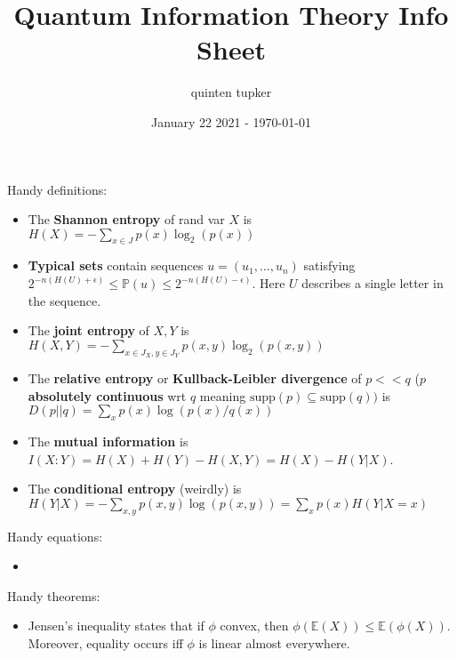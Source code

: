 \documentclass{article}
\title{Quantum Information Theory Info Sheet}
\author{quinten tupker}
\date{January 22 2021 - \today}
\theoremstyle{definition}
\begin{document}
\maketitle

Handy definitions:

\begin{itemize}
\item The \textbf{Shannon entropy} of rand var $X$ is $H(X) = -\sum_{x \in J} 
p(x) \log_2 (p(x))$
\item \textbf{Typical sets} contain sequences $u = (u_1, \dots, u_n)$ satisfying
$ 2^{-n(H(U) + \epsilon)} \leq \mathbb{P}(u) \leq 2^{-n(H(U) - \epsilon)}$. Here
$U$ describes a single letter in the sequence.
\item The \textbf{joint entropy} of $X, Y$ is $H(X, Y) = -\sum_{x \in J_X, y \in
  J_Y} p(x, y) \log_2(p(x, y))$
\item The \textbf{relative entropy} or \textbf{Kullback-Leibler divergence} of 
  $p << q$ ($p$ \textbf{absolutely continuous} wrt $q$ meaning $\text{supp}(p) 
    \subseteq \text{supp}(q))$ is $D(p||q) = \sum_x p(x) \log(p(x) / q(x))$
\item The \textbf{mutual information} is $I(X:Y) = H(X) + H(Y) - H(X, Y) =
  H(X) - H(Y | X)$.
\item The \textbf{conditional entropy} (weirdly) is $H(Y | X) = - \sum_{x, y}
  p(x, y) \log(p(x, y)) = \sum_x p(x) H(Y | X=x)$
\end{itemize}

Handy equations:

\begin{itemize}
\item
\end{itemize}

Handy theorems:

\begin{itemize}
\item Jensen's inequality states that if $\phi$ convex,
  then $\phi(\mathbb{E}(X)) \leq \mathbb{E}(\phi(X))$.
  Moreover, equality occurs iff $\phi$ is linear 
  almost everywhere.
\end{itemize}
\end{document}
